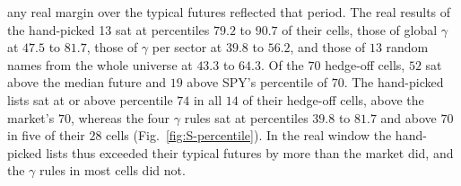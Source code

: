 any real margin over the typical futures reflected that period. The real results of the hand-picked 13 sat at
percentiles $79.2$ to $90.7$ of their cells, those of global $\gamma$ at $47.5$ to $81.7$, those of $\gamma$ per
sector at $39.8$ to $56.2$, and those of $13$ random names from the whole universe at $43.3$ to $64.3$. Of the $70$
hedge-off cells, $52$ sat above the median future and $19$ above SPY's percentile of $70$.
The hand-picked lists sat at or above percentile $74$ in all $14$ of their hedge-off cells, above the market's $70$,
whereas the four $\gamma$ rules sat at percentiles $39.8$ to $81.7$ and above $70$ in five of their $28$ cells
(Fig.~\ref{fig:S-percentile}). In the real window the hand-picked lists thus exceeded their typical futures by more
than the market did, and the $\gamma$ rules in most cells did not.

